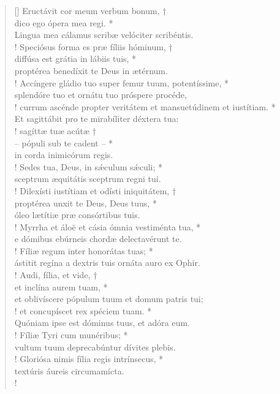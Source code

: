 \begin{verse}[\versewidth]
Eructávit cor meum verbum bonum, †\\
dico ego ópera mea regi. *\\
Lingua mea cálamus scribæ velóciter scribéntis.\\!
\vin Speciósus forma es præ fíliis hóminum, †\\
\vin diffúsa est grátia in lábiis tuis, *\\
\vin proptérea benedíxit te Deus in ætérnum.\\!
Accíngere gládio tuo super femur tuum, potentíssime, *\\
splendóre tuo et ornátu tuo próspere procéde,\\!
\vin currum ascénde propter veritátem et mansuetúdinem et iustítiam. *\\
\vin Et sagittábit pro te mirabíliter déxtera tua:\\!
sagíttæ tuæ acútæ †\\
– pópuli sub te cadent – *\\
in corda inimicórum regis.\\!
\vin Sedes tua, Deus, in s\'{æ}culum s\'{æ}culi; *\\
\vin sceptrum æquitátis sceptrum regni tui.\\!
Dilexísti iustítiam et odísti iniquitátem, †\\
proptérea unxit te Deus, Deus tuus, *\\
óleo lætítiæ præ consórtibus tuis.\\!
\vin Myrrha et áloë et cásia ómnia vestiménta tua, *\\
\vin e dómibus ebúrneis chordæ delectavérunt te.\\!
Fíliæ regum inter honorátas tuas; *\\
ástitit regína a dextris tuis ornáta auro ex Ophir.\\!
\vin Audi, fília, et vide, †\\
\vin et inclína aurem tuam, *\\
\vin et oblivíscere pópulum tuum et domum patris tui;\\!
et concupíscet rex spéciem tuam. *\\
Quóniam ipse est dóminus tuus, et adóra eum.\\!
\vin Fíliæ Tyri cum munéribus; *\\
\vin vultum tuum deprecabúntur dívites plebis.\\!
Gloriósa nimis fília regis intrínsecus, *\\
textúris áureis circumamícta.\\!

\end{verse}
